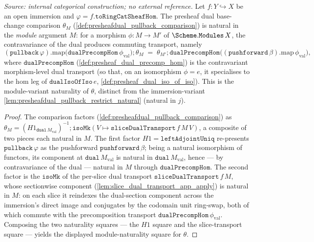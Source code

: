 \begin{lemma}\leanok
  \label{lem:presheafdual_pullback_comparison_natural_module}
  \textit{Source: internal categorical construction; no external reference.}
  Let \(f : Y \hookrightarrow X\) be an open immersion and \(\varphi = f.\mathtt{toRingCatSheafHom}\).
  The presheaf dual base-change comparison \(\theta_M\)
  (\cref{def:presheafdual_pullback_comparison}) is natural in the \emph{module} argument \(M\):
  for a morphism \(\phi : M \to M'\) of \(\Scheme.\mathtt{Modules}\,X\), the contravariance of the dual
  produces commuting transport, namely
  \[
    (\mathtt{pullback}\,\varphi).\mathrm{map}\bigl(\mathtt{dualPrecompHom}\,\phi_{\mathrm{val}}\bigr)
      \mathbin{;} \theta_M
    \;=\; \theta_{M'} \mathbin{;}
      \mathtt{dualPrecompHom}\bigl((\mathtt{pushforward}\,\beta).\mathrm{map}\,\phi_{\mathrm{val}}\bigr),
  \]
  where \(\mathtt{dualPrecompHom}\) (\cref{def:presheaf_dual_precomp_hom}) is the contravariant
  morphism-level dual transport (so that, on an isomorphism \(\phi = e\), it specialises to the
  \(\mathrm{hom}\) leg of \(\mathtt{dualIsoOfIso}\,e\), \cref{def:presheaf_dual_iso_of_iso}). This is
  the module-variant naturality of \(\theta\), distinct from the immersion-variant
  \cref{lem:presheafdual_pullback_restrict_natural} (natural in \(j\)).
\end{lemma}
\begin{proof}
  \leanok
  The comparison factors (\cref{def:presheafdual_pullback_comparison}) as
  \(\theta_M = (H1_{\mathtt{dual}\,M_{\mathrm{val}}})^{-1} \mathbin{;}
    \mathtt{isoMk}(V \mapsto \mathtt{sliceDualTransport}\,f\,M\,V)\), a composite of two pieces each
  natural in \(M\). The first factor \(H1 = \mathtt{leftAdjointUniq}\) re-presents
  \(\mathtt{pullback}\,\varphi\) as the pushforward \(\mathtt{pushforward}\,\beta\); being a natural
  isomorphism of functors, its component at \(\mathtt{dual}\,M_{\mathrm{val}}\) is natural in
  \(\mathtt{dual}\,M_{\mathrm{val}}\), hence --- by contravariance of the dual --- natural in \(M\)
  through \(\mathtt{dualPrecompHom}\). The second factor is the \(\mathtt{isoMk}\) of the per-slice
  dual transport \(\mathtt{sliceDualTransport}\,f\,M\), whose sectionwise component
  (\cref{lem:slice_dual_transport_app_apply}) is natural in \(M\): on each slice it reindexes the
  dual-section component across the immersion's direct image and conjugates by the codomain unit
  ring-swap, both of which commute with the precomposition transport
  \(\mathtt{dualPrecompHom}\,\phi_{\mathrm{val}}\). Composing the two naturality squares --- the
  \(H1\) square and the slice-transport square --- yields the displayed module-naturality square for
  \(\theta\).
\end{proof}

